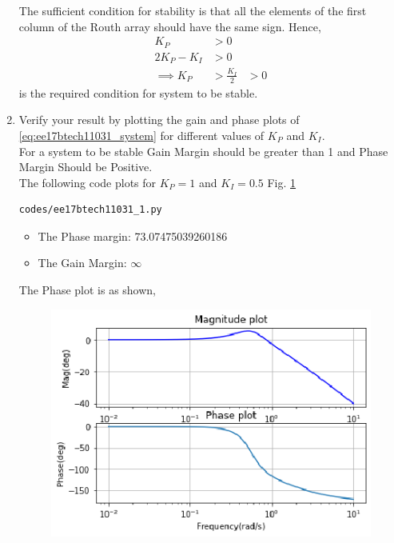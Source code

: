 \begin{enumerate}[label=\thesection.\arabic*.,ref=\thesection.\theenumi]
The sufficient condition for stability is that all the elements of the first column of the Routh array should have the same sign.
Hence, 
\begin{align}
K_{P} &> 0
\label{eq:ee17btech11031_cond1}\\
2K_{P} - K_{I} &> 0
\label{eq:ee17btech11031_cond2}\\
\implies K_{P} &> \frac{K_{I}}{2} &> 0
\label{eq:ee17btech11031_cond3}
\end{align}
%
 is the required condition for system to be stable.


\item Verify your result by plotting the gain and phase plots of \eqref{eq:ee17btech11031_system} for different values of $K_{P}$ and $K_{I}$.
\\
\solution For a system to be stable Gain Margin should be greater than 1 and Phase Margin Should be Positive.
\\
The following code plots for $K_{P} = 1$ and $K_{I} = 0.5$ Fig. \ref{fig:ee17btech11031_1}

\begin{lstlisting}
codes/ee17btech11031_1.py
\end{lstlisting}
\begin{itemize}
    \item The Phase margin: 73.07475039260186
    \item The Gain Margin: $\infty$
\end{itemize}

The Phase plot is as shown,
\begin{figure}[!ht]
  \centering
  \includegraphics[width=\columnwidth]{./figs/ee17btech11031/ee17btech11031_1.eps}
  \caption{}
  \label{fig:ee17btech11031_1}
\end{figure}


\end{enumerate}
